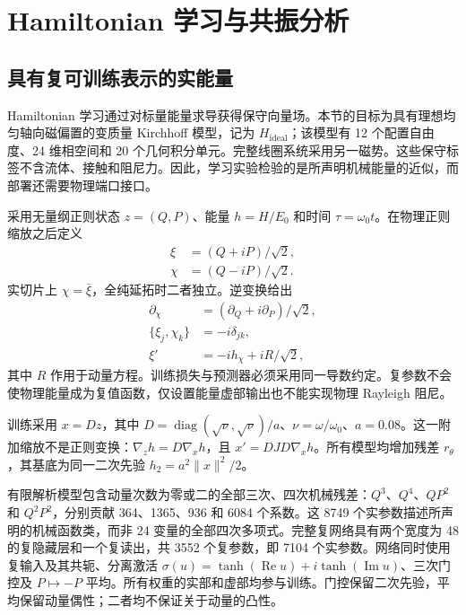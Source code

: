 \section{Hamiltonian 学习与共振分析}
\label{sec:learning-kam}

\subsection{具有复可训练表示的实能量}
Hamiltonian 学习通过对标量能量求导获得保守向量场\citep{Greydanus2019,Chen2022}。本节的目标为具有理想均匀轴向磁偏置的变质量 Kirchhoff 模型，记为 $H_{\mathrm{ideal}}$；该模型有 12 个配置自由度、24 维相空间和 20 个几何积分单元。完整线圈系统采用另一磁势。这些保守标签不含流体、接触和阻尼力。因此，学习实验检验的是所声明机械能量的近似，而部署还需要物理端口接口。

采用无量纲正则状态 $z=(Q,P)$、能量 $h=H/E_0$ 和时间 $\tau=\omega_0t$。在物理正则缩放之后定义
\begin{equation}
 \begin{aligned}
 \xi&=(Q+iP)/\sqrt2,\\
 \chi&=(Q-iP)/\sqrt2.
 \end{aligned}
 \label{eq:learn-complex-coordinate}
\end{equation}
实切片上 $\chi=\bar\xi$，全纯延拓时二者独立。逆变换给出
\begin{equation}
 \begin{aligned}
 \partial_\chi&=(\partial_Q+i\partial_P)/\sqrt2,\\
 \{\xi_j,\chi_k\}&=-i\delta_{jk},\\
 \xi'&=-ih_\chi+iR/\sqrt2,
 \end{aligned}
 \label{eq:learn-complex-field}
\end{equation}
其中 $R$ 作用于动量方程。训练损失与预测器必须采用同一导数约定。复参数不会使物理能量成为复值函数，仅设置能量虚部输出也不能实现物理 Rayleigh 阻尼。

训练采用 $x=Dz$，其中 $D=\operatorname{diag}(\sqrt\nu,\sqrt\nu)/a$、$\nu=\omega/\omega_0$、$a=0.08$。这一附加缩放不是正则变换：$\nabla_zh=D\nabla_xh$，且 $x'=DJD\nabla_xh$。所有模型均增加残差 $r_\theta$，其基底为同一二次先验 $h_2=a^2\|x\|^2/2$。

有限解析模型包含动量次数为零或二的全部三次、四次机械残差：$Q^3$、$Q^4$、$QP^2$ 和 $Q^2P^2$，分别贡献 364、1365、936 和 6084 个系数。这 8749 个实参数描述所声明的机械函数类，而非 24 变量的全部四次多项式。完整复网络具有两个宽度为 48 的复隐藏层和一个复读出，共 3552 个复参数，即 7104 个实参数。网络同时使用复输入及其共轭、分离激活 $\sigma(u)=\tanh(\operatorname{Re}u)+i\tanh(\operatorname{Im}u)$、三次门控及 $P\mapsto-P$ 平均。所有权重的实部和虚部均参与训练。门控保留二次先验，平均保留动量偶性；二者均不保证关于动量的凸性。

